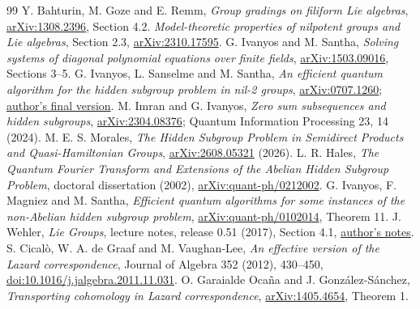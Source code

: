 \documentclass[11pt]{article}
\theoremstyle{remark}
\begin{document}
\begin{thebibliography}{99}
Y. Bahturin, M. Goze and E. Remm,
\emph{Group gradings on filiform Lie algebras},
\href{https://arxiv.org/abs/1308.2396}{arXiv:1308.2396}, Section 4.2.
\emph{Model-theoretic properties of nilpotent groups and Lie algebras},
Section 2.3, \href{https://arxiv.org/abs/2310.17595}{arXiv:2310.17595}.
G. Ivanyos and M. Santha,
\emph{Solving systems of diagonal polynomial equations over finite fields},
\href{https://arxiv.org/abs/1503.09016}{arXiv:1503.09016}, Sections 3--5.
G. Ivanyos, L. Sanselme and M. Santha,
\emph{An efficient quantum algorithm for the hidden subgroup problem in
nil-2 groups}, \href{https://arxiv.org/abs/0707.1260}{arXiv:0707.1260};
\href{https://www.irif.fr/~santha/Papers/iss12.pdf}{author's final version}.
M. Imran and G. Ivanyos,
\emph{Zero sum subsequences and hidden subgroups},
\href{https://arxiv.org/abs/2304.08376}{arXiv:2304.08376};
Quantum Information Processing 23, 14 (2024).
M. E. S. Morales,
\emph{The Hidden Subgroup Problem in Semidirect Products and
Quasi-Hamiltonian Groups},
\href{https://arxiv.org/abs/2608.05321}{arXiv:2608.05321} (2026).
L. R. Hales,
\emph{The Quantum Fourier Transform and Extensions of the Abelian Hidden
Subgroup Problem}, doctoral dissertation (2002),
\href{https://arxiv.org/abs/quant-ph/0212002}{arXiv:quant-ph/0212002}.
G. Ivanyos, F. Magniez and M. Santha,
\emph{Efficient quantum algorithms for some instances of the non-Abelian
hidden subgroup problem},
\href{https://arxiv.org/abs/quant-ph/0102014}{arXiv:quant-ph/0102014}, Theorem 11.
J. Wehler, \emph{Lie Groups}, lecture notes, release 0.51 (2017), Section 4.1,
\href{https://www.mathematik.uni-muenchen.de/~wehler/LieAlgebrasLieGroupsScript.pdf}{author's notes}.
S. Cical\`o, W. A. de Graaf and M. Vaughan-Lee,
\emph{An effective version of the Lazard correspondence},
Journal of Algebra 352 (2012), 430--450,
\href{https://doi.org/10.1016/j.jalgebra.2011.11.031}{doi:10.1016/j.jalgebra.2011.11.031}.
O. Garaialde Oca\~na and J. Gonz\'alez-S\'anchez,
\emph{Transporting cohomology in Lazard correspondence},
\href{https://arxiv.org/abs/1405.4654}{arXiv:1405.4654}, Theorem 1.
\end{thebibliography}
\end{document}
